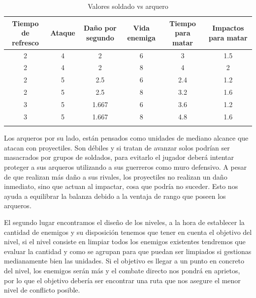 \begin{longtable}[c]{|c|c|c|c|c|c|}
\hline
\multicolumn{1}{|m{1.8cm}|}{Tiempo de refresco} & \multicolumn{1}{m{1.2cm}|}{Ataque}             &
\multicolumn{1}{m{1.7cm}|}{Daño por segundo}   & \multicolumn{1}{m{1.4cm}|}{Vida enemiga}        &
\multicolumn{1}{m{1.2cm}|}{Tiempo para matar}  & \multicolumn{1}{m{1.45cm}|}{Impactos para matar}\\
\hline
\hline
\endhead
\multicolumn{1}{|S|}{2} & \multicolumn{1}{S|}{4} & \multicolumn{1}{S|}{2} & 
\multicolumn{1}{S|}{6}  & \multicolumn{1}{S|}{3} & \multicolumn{1}{S|}{1.5} \\
\hline
\multicolumn{1}{|S|}{2} & \multicolumn{1}{S|}{4} & \multicolumn{1}{S|}{2}   & 
\multicolumn{1}{S|}{8}  & \multicolumn{1}{S|}{4} & \multicolumn{1}{S|}{2} \\ 
\hline
\multicolumn{1}{|S|}{2} & \multicolumn{1}{S|}{5}   & \multicolumn{1}{S|}{2.5} & 
\multicolumn{1}{S|}{6}  & \multicolumn{1}{S|}{2.4} & \multicolumn{1}{S|}{1.2} \\ 
\hline
\multicolumn{1}{|S|}{2} & \multicolumn{1}{S|}{5}   & \multicolumn{1}{S|}{2.5} & 
\multicolumn{1}{S|}{8}  & \multicolumn{1}{S|}{3.2} & \multicolumn{1}{S|}{1.6} \\
\hline
\multicolumn{1}{|S|}{3} & \multicolumn{1}{S|}{5}   & \multicolumn{1}{S|}{1.667} & 
\multicolumn{1}{S|}{6}  & \multicolumn{1}{S|}{3.6} & \multicolumn{1}{S|}{1.2}   \\
\hline
\multicolumn{1}{|S|}{3} & \multicolumn{1}{S|}{5}   & \multicolumn{1}{S|}{1.667} & 
\multicolumn{1}{S|}{8}  & \multicolumn{1}{S|}{4.8} & \multicolumn{1}{S|}{1.6}   \\
\hline
\caption{Valores soldado vs arquero}
\end{longtable}

Los arqueros por su lado, están pensados como unidades de mediano alcance que atacan con proyectiles.
Son débiles y si tratan de avanzar solos podrían ser masacrados por grupos de soldados, para evitarlo 
el jugador deberá intentar proteger a sus arqueros utilizando a sus guerreros como muro defensivo. 
A pesar de que realizan más daño a sus rivales, los proyectiles no realizan un daño inmediato, sino que
actuan al impactar, cosa que podría no suceder. Esto nos ayuda a equilibrar la balanza debido a la ventaja
de rango que poseen los arqueros.

El segundo lugar encontramos el diseño de los niveles, a la hora de establecer la cantidad de enemigos
y su disposición tenemos que tener en cuenta el objetivo del nivel, si el nivel consiste en limpiar
todos los enemigos existentes tendremos que evaluar la cantidad y como se agrupan para que puedan
ser limpiados si gestionas medianamente bien las unidades. Si el objetivo es llegar a un punto en concreto
del nivel, los enemigos serán más y el combate directo nos pondrá en aprietos, por lo que el objetivo
debería ser encontrar una ruta que nos asegure el menor nivel de conflicto posible.

